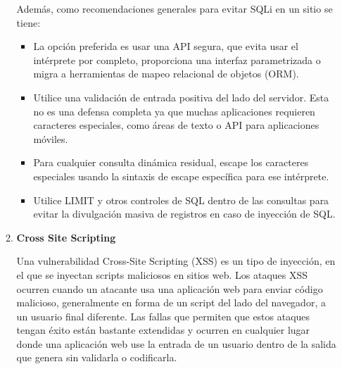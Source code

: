 \documentclass[12pt,oneside,a4paper]{book}
\begin{document}
\begin{enumerate}
\begin{enumerate}
\begin{enumerate}
\begin{enumerate}
\begin{enumerate}
                \end{enumerate}
            \end{enumerate}
        \end{enumerate}

        \vspace{1em}

        \hspace{20pt}
        Además, como recomendaciones generales para evitar SQLi en un sitio se tiene:

        \vspace{1em}
        
        \begin{itemize}
            \item La opción preferida es usar una API segura, que evita usar el intérprete por completo, proporciona una interfaz parametrizada o migra a herramientas de mapeo relacional de objetos (ORM).
            \item Utilice una validación de entrada positiva del lado del servidor. Esta no es una defensa completa ya que muchas aplicaciones requieren caracteres especiales, como áreas de texto o API para aplicaciones móviles.
            \item Para cualquier consulta dinámica residual, escape los caracteres especiales usando la sintaxis de escape específica para ese intérprete.
            \item Utilice LIMIT y otros controles de SQL dentro de las consultas para evitar la divulgación masiva de registros en caso de inyección de SQL.   
        \end{itemize}

        \vspace{2em}
        
        \item{\textbf{Cross Site Scripting}}

        \vspace{1em}

        \hspace{20pt}
        Una vulnerabilidad Cross-Site Scripting (XSS) es un tipo de inyección, en el que se inyectan scripts maliciosos en sitios web. Los ataques XSS ocurren cuando un atacante usa una aplicación web para enviar código malicioso, generalmente en forma de un script del lado del navegador, a un usuario final diferente. Las fallas que permiten que estos ataques tengan éxito están bastante extendidas y ocurren en cualquier lugar donde una aplicación web use la entrada de un usuario dentro de la salida que genera sin validarla o codificarla.


\end{enumerate}
\end{enumerate}
\end{document}
